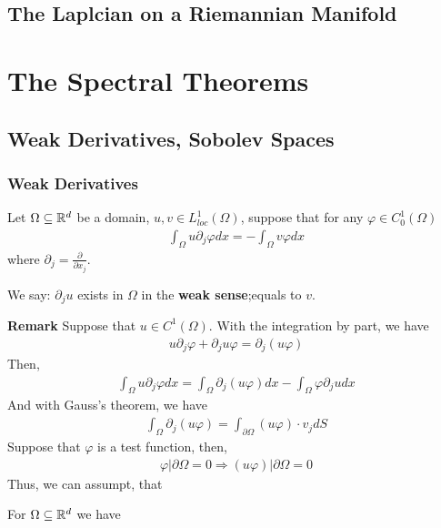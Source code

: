 \documentclass[Total.tex]{subfiles}
\begin{document}
			\subsection{The Laplcian on a Riemannian Manifold}
		\section{The Spectral Theorems}
			\subsection{Weak Derivatives, Sobolev Spaces}
				\subsubsection{Weak Derivatives}
					\begin{Def}
						Let $\Omega\subseteq \mathbb{R}^d$ be a domain, $u,v\in L^1_{loc}(\Omega)$, suppose that for any $\varphi\in C^1_0(\Omega)$
						\begin{gather*}
							\int_\Omega u\partial_j \varphi dx=-\int_\Omega v\varphi dx
						\end{gather*}
						where $\partial_j=\frac{\partial}{\partial x_j}$. 
						
						We say: $\partial_j u$ exists in $\Omega$ in the \textbf{weak sense};equals to $v$.
					\end{Def}
					\textbf{Remark} Suppose that $u\in C^1(\Omega)$. With the integration by part, we have
					\begin{gather*}
						u\partial_j \varphi +\partial_j u \varphi =\partial_j (u\varphi)
					\end{gather*}
					Then,
					\begin{gather*}
						\int_\Omega u\partial_j\varphi dx=\int_\Omega \partial_j (u\varphi)dx-\int_\Omega  \varphi\partial_j udx
					\end{gather*}
					And with Gauss's theorem, we have
					\begin{gather*}
						\int_\Omega \partial_j(u\varphi)=\int_{\partial\Omega} (u\varphi)\cdot v_j dS
					\end{gather*}
					Suppose that $\varphi$ is a test function, then,
					\begin{gather*}
						\varphi|\partial \Omega=0\Rightarrow (u\varphi)|\partial \Omega=0
					\end{gather*}
					Thus, we can assumpt, that
					\begin{proposition}
						For $\Omega\subseteq \mathbb{R}^d$ we have
					\end{proposition}
\end{document}
